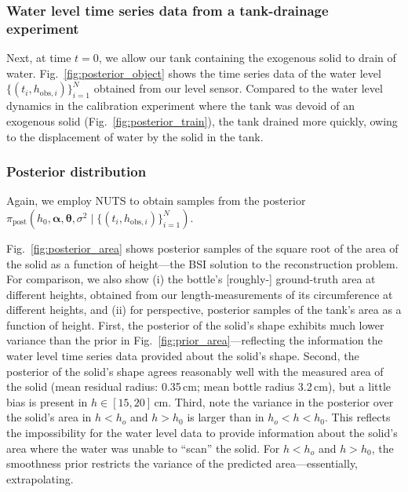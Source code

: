 \documentclass[a4paper,fleqn]{cas-dc}
\newcommand\thedata {$\{(t_i,h_{\text{obs}, i})\}_{i=1}^{N}$\xspace}
\newcommand\thedatanomath {\{(t_i,h_{\text{obs}, i})\}_{i=1}^{N}}
\begin{document}
\subsubsection{Water level time series data from a tank-drainage experiment}
Next, at time $t=0$, we allow our tank containing the exogenous solid to drain of water. Fig.~\ref{fig:posterior_object} shows the time series data of the water level \thedata obtained from our level sensor. Compared to the water level dynamics in the calibration experiment where the tank was devoid of an exogenous solid (Fig.~\ref{fig:posterior_train}), the tank drained more quickly, owing to the displacement of water by the solid in the tank.

\subsubsection{Posterior distribution}
Again, we employ NUTS to obtain samples from the posterior $\pi_{\text{post}}(h_0, \boldsymbol \alpha, \boldsymbol \theta, \sigma^2 \mid \thedatanomath)$. 




Fig.~\ref{fig:posterior_area} shows posterior samples of the square root of the area of the solid as a function of height---the BSI solution to the reconstruction problem. 
For comparison, we also show (i) the bottle's [roughly-] ground-truth area at different heights, obtained from our length-measurements of its circumference at different heights, and (ii) for perspective, posterior samples of the tank's area as a function of height. First, the posterior of the solid's shape exhibits much lower variance than the prior in Fig.~\ref{fig:prior_area}---reflecting the information the water level time series data provided about the solid's shape. 
Second, the posterior of the solid's shape agrees reasonably well with the measured area of the solid (mean residual radius: 0.35\,cm; mean bottle radius 3.2\,cm), but a little bias is present in $h\in[15, 20]$\,cm.
Third, note the variance in the posterior over the solid's area in $h<h_o$ and $h>h_0$ is larger than in $h_o < h < h_0$. This reflects the impossibility for the water level data to provide information about the solid's area where the water was unable to ``scan'' the solid. 
For $h<h_o$ and $h>h_0$, the smoothness prior restricts the variance of the predicted area---essentially, extrapolating. 
\end{document}
